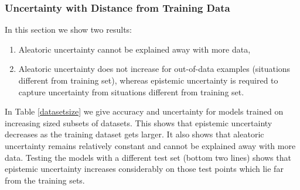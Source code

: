 \subsubsection{Uncertainty with Distance from Training Data}

In this section we show two results:
\begin{enumerate}
\item Aleatoric uncertainty cannot be explained away with more data,
\item Aleatoric uncertainty does not increase for out-of-data examples (situations different from training set), whereas epistemic uncertainty is required to capture uncertainty from situations different from training set.
\end{enumerate}

In Table \ref{datasetsize} we give accuracy and uncertainty for models trained on increasing sized subsets of datasets. This shows that epistemic uncertainty decreases as the training dataset gets larger. It also shows that aleatoric uncertainty remains relatively constant and cannot be explained away with more data.
Testing the models with a different test set (bottom two lines) shows that epistemic uncertainty increases considerably on those test points which lie far from the training sets.









